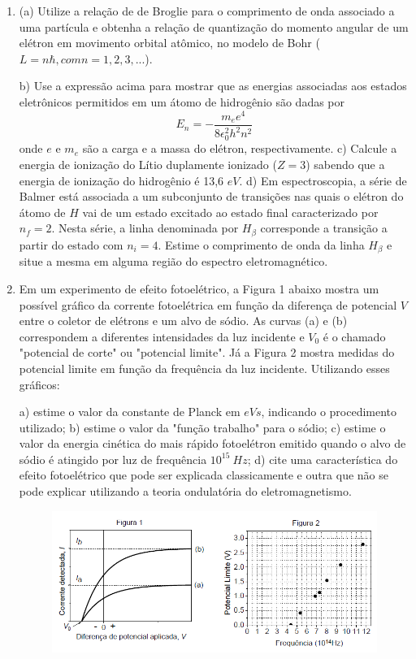 \begin{enumerate}[start=1,label={\bfseries Q\arabic*.}]
\item (a) Utilize a relação de de Broglie para o comprimento de onda associado a uma partícula e obtenha a relação de quantização do momento angular de um elétron em movimento orbital atômico, no modelo de Bohr ($L = n \hbar, com n=1, 2, 3, ... $).

b) Use a expressão acima para mostrar que as energias associadas aos estados eletrônicos permitidos em um átomo de hidrogênio são dadas por
$$
E_{n}=-\frac{m_{e} e^{4}}{8 \epsilon_{0}^{2} h^{2} n^{2}}
$$
onde $e$ e $m_{e}$ são a carga e a massa do elétron, respectivamente.
c) Calcule a energia de ionização do Lítio duplamente ionizado ($Z = 3$) sabendo que a energia de ionização do hidrogênio é 13,6 $eV$.
d) Em espectroscopia, a série de Balmer está associada a um subconjunto de transições nas quais o elétron do átomo de $H$ vai de um estado excitado ao estado final caracterizado por $n_{f} = 2$. Nesta série, a linha denominada por $H_{\beta}$ corresponde a transição a partir do estado com $n_{i} = 4$. Estime o comprimento de onda da linha $H_{\beta}$ e situe a mesma em alguma região do espectro eletromagnético.




\item Em um experimento de efeito fotoelétrico, a Figura 1 abaixo mostra um possível gráfico da corrente fotoelétrica em função da diferença de potencial $V$ entre o coletor de elétrons e um alvo de sódio. As curvas (a) e (b) correspondem a diferentes intensidades da luz incidente e $V_{0}$ é o chamado "potencial de corte" ou "potencial limite". Já a Figura 2 mostra medidas do potencial limite em função da frequência da luz incidente. Utilizando esses gráficos:

a) estime o valor da constante de Planck em $eVs$, indicando o procedimento utilizado;
b) estime o valor da "função trabalho" para o sódio;
c) estime o valor da energia cinética do mais rápido fotoelétron emitido quando o alvo de sódio é atingido por luz de frequência $10^{15} \ Hz$;
d) cite uma característica do efeito fotoelétrico que pode ser explicada classicamente e outra que não se pode explicar utilizando a teoria ondulatória do eletromagnetismo.


\begin{figure}[H]
  \centering
  \includegraphics[scale=0.8]{moderna-img/grafico.png}
\end{figure}





\end{enumerate}
